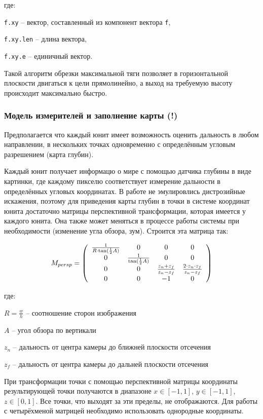 где:

\verb|f.xy| -- вектор, составленный из компонент вектора \verb|f|,

\verb|f.xy.len| -- длина вектора,

\verb|f.xy.e| -- единичный вектор.

Такой алгоритм обрезки максимальной тяги позволяет в горизонтальной плоскости двигаться к цели прямолинейно,
а выход на требуемую высоту происходит максимально быстро.

\newpage
\subsubsection{Модель измерителей и заполнение карты (!)}

Предполагается что каждый юнит имеет возможность
оценить дальность в любом направлении, в нескольких точках одновременно с определённым 
угловым разрешением (карта глубин).

Каждый юнит получает информацю о мире с помощью датчика глубины в виде картинки,
где каждому пикселю соответствует измерение дальности в определённых угловых координатах. В работе не эмулировлись
дистрозийные искажения, поэтому для приведения карты глубин в точки в системе координат юнита достаточно 
матрицы перспективной трансформации, которая имеется у каждого юнита. Она также может меняться в процессе работы
системы при необходимости (изменение угла обзора, зум). Строится эта матрица так:

$$
M_{persp} = \left( \begin{array}{c c c c}
        \frac{1}{ R \cdot \tan( \frac{1}{2} A ) } & 0 & 0 & 0 \\
        0 & \frac{1}{ \tan( \frac{1}{2} A ) } & 0 & 0 \\
        0 & 0 & \frac{ z_{n} + z_{f} }{ z_{n}-z_{f} } & \frac{ 2 \cdot z_{n} \cdot z_{f} }{ z_{n} - z_{f} } \\
        0 & 0 & -1 & 0
\end{array} \right)
$$

где:

$R = \frac{w}{h}$ -- соотношение сторон изображения

$A$ -- угол обзора по вертикали

$z_{n}$ -- дальность от центра камеры до ближней плоскости отсечения

$z_{f}$ -- дальность от центра камеры до дальней плоскости отсечения

При трансформации точки с помощью перспективной матрицы координаты результирующей точки
получаются в диапазоне $x \in [-1,1]$, $y \in [-1,1]$, $z \in [0,1]$. Все точки, что выходят
за эти пределы, не отображаются. Для работы с четырёхменой матрицей необходимо использовать
однородные координаты.

